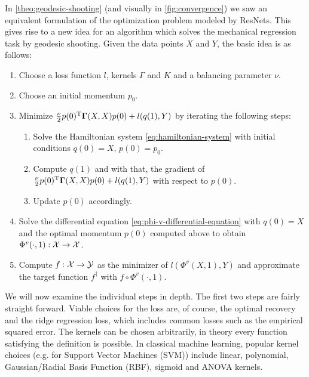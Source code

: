 In \cref{theo:geodesic-shooting} (and visually in \cref{fig:convergence}) we saw an equivalent formulation of the optimization problem modeled by ResNets.
This gives rise to a new idea for an algorithm which solves the mechanical regression task by geodesic shooting.
Given the data points $X$ and $Y$, the basic idea is as follows:
\begin{enumerate}[label=\arabic*.]
	\item Choose a loss function $l$, kernels $\Gamma$ and $K$ and a balancing parameter $\nu$.
	\item Choose an initial momentum $p_0$.
	\item Minimize $\frac{\nu}{2} p(0)^{\mathrm{T}} \mathbf{\Gamma}(X, X)p(0) + l(q(1), Y)$ by iterating the following steps:
	\begin{enumerate}[label=\arabic*.]
		\item Solve the Hamiltonian system \ref{eq:hamiltonian-system} with initial conditions $q(0) = X$, $p(0) = p_0$.
		\item Compute $q(1)$ and with that, the gradient of $\frac{\nu}{2} p(0)^{\mathrm{T}} \mathbf{\Gamma}(X, X)p(0) + l(q(1), Y)$ with respect to $p(0)$.
		\item Update $p(0)$ accordingly.
	\end{enumerate}
	\item Solve the differential equation \ref{eq:phi-v-differential-equation} with $q(0) = X$ and the optimal momentum $p(0)$ computed above to obtain $\Phi^v(\cdot, 1): \mathcal{X} \rightarrow \mathcal{X}$.
	\item Compute $f: \mathcal{X} \rightarrow \mathcal{Y}$ as the minimizer of $l(\Phi^v(X, 1), Y)$ and approximate the target function $f^\dagger$ with $f \circ \Phi^v(\cdot, 1)$.
\end{enumerate}

We will now examine the individual steps in depth.
The first two steps are fairly straight forward.
Viable choices for the loss are, of course, the optimal recovery and the ridge regression loss, which includes common losses such as the empirical squared error.
The kernels can be chosen arbitrarily, in theory every function satisfying the definition is possible.
In classical machine learning, popular kernel choices (e.g. for Support Vector Machines (SVM)) include linear, polynomial, Gaussian/Radial Basis Function (RBF), sigmoid and ANOVA kernels.

